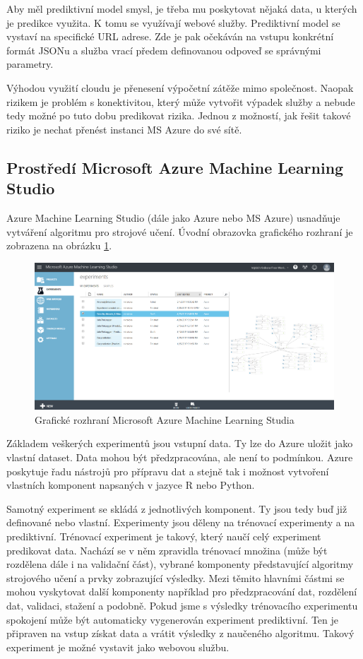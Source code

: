 \documentclass[thesis=M,czech]{FITthesis}[2012/10/20]
\newcommand{\tmpframe}[1]{\fbox{#1}}
\renewcommand{\tmpframe}[1]{#1}
\begin{document}
		Aby měl prediktivní model smysl, je třeba mu poskytovat nějaká data, u kterých je predikce využita. K tomu se využívají webové služby.
		Prediktivní model se vystaví na specifické URL adrese. Zde je pak očekáván na vstupu konkrétní formát JSONu a služba vrací předem definovanou odpoveď se správnými parametry.
		
		Výhodou využití cloudu je přenesení výpočetní zátěže mimo společnost. Naopak rizikem je problém s konektivitou, který může vytvořit výpadek služby a nebude tedy možné po tuto dobu predikovat rizika. Jednou z možností, jak řešit takové riziko je nechat přenést instanci MS Azure do své sítě.
		
		\subsection{Prostředí Microsoft Azure Machine Learning Studio}
			Azure Machine Learning Studio (dále jako Azure nebo MS Azure) usnadňuje vytváření algoritmu pro strojové učení. Úvodní obrazovka grafického rozhraní je zobrazena na obrázku \ref{fig:MSAzureML}.
			
			\begin{figure}[htb]\centering
				\tmpframe{\includegraphics[width=\textwidth]{./img/MSAzureML}}		
				\caption{Grafické rozhraní Microsoft Azure Machine Learning Studia}
				\label{fig:MSAzureML}
			\end{figure}
			
			Základem veškerých experimentů jsou vstupní data. Ty lze do Azure uložit jako vlastní dataset. Data mohou být předzpracována, ale není to podmínkou. Azure poskytuje řadu nástrojů pro přípravu dat a stejně tak i možnost vytvoření vlastních komponent napsaných v jazyce R nebo Python.
			
			Samotný experiment se skládá z jednotlivých komponent. Ty jsou tedy buď již definované nebo vlastní. Experimenty jsou děleny na trénovací experimenty a na prediktivní. Trénovací experiment je takový, který naučí celý experiment predikovat data. Nachází se v něm zpravidla trénovací množina (může být rozdělena dále i na validační část), vybrané komponenty představující algoritmy strojového učení a prvky zobrazující výsledky. Mezi těmito hlavními částmi se mohou vyskytovat další komponenty například pro předzpracování dat, rozdělení dat, validaci, stažení a podobně. Pokud jsme s výsledky trénovacího experimentu spokojení může být automaticky vygenerován experiment prediktivní. Ten je připraven na vstup získat data a vrátit výsledky z naučeného algoritmu. Takový experiment je možné vystavit jako webovou službu.
			
\end{document}
